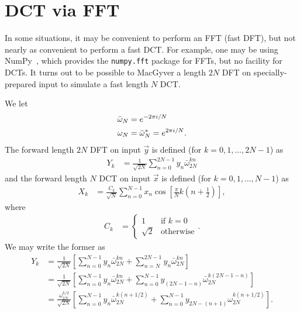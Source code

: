 \section{DCT via FFT}

In some situations, it may be convenient to perform an FFT (fast DFT), but not nearly as convenient to perform a fast DCT.
For example, one may be using NumPy~\cite{van2011numpy}, which provides the \texttt{numpy.fft} package for FFTs, but no facility for DCTs.
It turns out to be possible to MacGyver a length $2 N$ DFT on specially-prepared input to simulate a fast length $N$ DCT.

We let
\begin{subequations}
\begin{align}
	\bar{\omega}_N
	&= e^{-2 \pi i / N} \\
	\omega_N
	&= \bar{\omega}_N^*
	= e^{2 \pi i / N}.
\end{align}
\end{subequations}
The forward length $2 N$ DFT on input $\vec{y}$ is defined (for $k = 0, 1, \ldots, 2 N - 1$) as
\begin{align}
	Y_k
	&= \frac{1}{\sqrt{2 N}} \sum_{n=0}^{2 N - 1} y_n \bar{\omega}_{2 N}^{k n}
\end{align}
and the forward length $N$ DCT on input $\vec{x}$ is defined (for $k = 0, 1, \ldots, N - 1$) as
\begin{align}
	X_k
	&= \frac{C_k}{\sqrt{N}} \sum_{n=0}^{N - 1} x_n \cos{\left[ \frac{\pi}{N} k \left( n + \frac{1}{2} \right) \right]},
		\label{eq:dct}
\end{align}
where
\begin{align}
	C_k
	&= \begin{cases}
			1 & \text{if } k = 0 \\
			\sqrt{2} & \text{otherwise}
		\end{cases}.
\end{align}
We may write the former as
\begin{subequations}
\begin{align}
	Y_k
	&= \frac{1}{\sqrt{2 N}} \left[
			\sum_{n=0}^{N - 1} y_n \bar{\omega}_{2 N}^{k n}
			+ \sum_{n=N}^{2 N - 1} y_n \bar{\omega}_{2 N}^{k n}
		\right] \\
	&= \frac{1}{\sqrt{2 N}} \left[
			\sum_{n=0}^{N - 1} y_n \bar{\omega}_{2 N}^{k n}
			+ \sum_{n=0}^{N - 1} y_{(2 N - 1 - n)} \bar{\omega}_{2 N}^{k (2 N - 1 - n)}
		\right] \\
	&= \frac{\omega_{2 N}^{k/2}}{\sqrt{2 N}} \left[
			\sum_{n=0}^{N - 1} y_n \bar{\omega}_{2 N}^{k (n + 1/2)}
			+ \sum_{n=0}^{N - 1} y_{2 N - (n + 1)} \omega_{2 N}^{k (n + 1/2)}
		\right].
\end{align}
\end{subequations}
